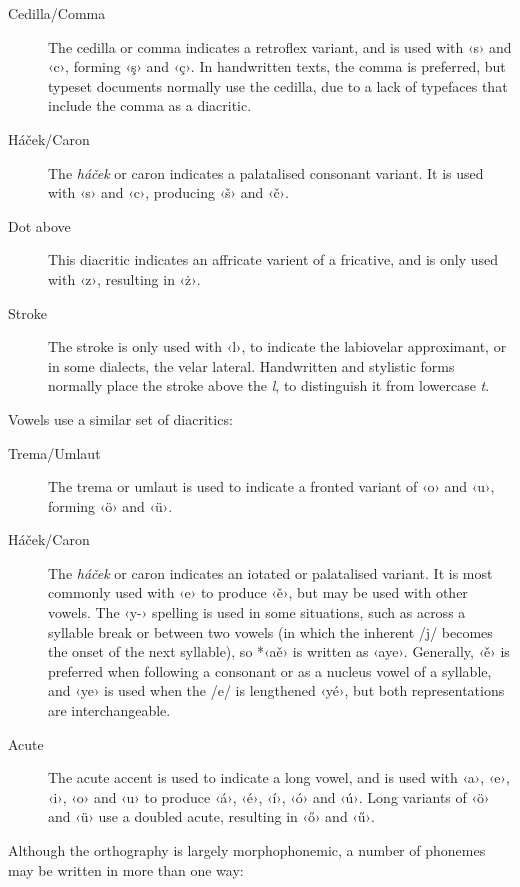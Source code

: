 \documentclass[grammar]{subfiles}
\begin{document}
	\begin{description}
		\item[Cedilla/Comma] The cedilla or comma indicates a retroflex variant, and is used with ‹s› and ‹c›, forming ‹ş› and ‹ç›. In handwritten texts, the comma is preferred, but typeset documents normally use the cedilla, due to a lack of typefaces that include the comma as a diacritic.
		\item[Háček/Caron] The \emph{háček} or caron indicates a palatalised consonant variant. It is used with ‹s› and ‹c›, producing ‹š› and ‹č›.
		\item[Dot above] This diacritic indicates an affricate varient of a fricative, and is only used with ‹z›, resulting in ‹ż›.
		\item[Stroke] The stroke is only used with ‹l›, to indicate the labiovelar approximant, or in some dialects, the velar lateral. Handwritten and stylistic forms normally place the stroke above the \emph l, to distinguish it from lowercase \emph t.
	\end{description}

	Vowels use a similar set of diacritics:

	\begin{description}
		\item[Trema/Umlaut] The trema or umlaut is used to indicate a fronted variant of ‹o› and ‹u›, forming ‹ö› and ‹ü›.
		\item[Háček/Caron]\label{def:hacek} The \emph{háček} or caron indicates an iotated or palatalised variant. It is most commonly used with ‹e› to produce ‹ě›, but may be used with other vowels. The ‹y-› spelling is used in some situations, such as across a syllable break or between two vowels (in which the inherent /j/ becomes the onset of the next syllable), so *‹aě› is written as ‹aye›. Generally, ‹ě› is preferred when following a consonant or as a nucleus vowel of a syllable, and ‹ye› is used when the /e/ is lengthened ‹yé›, but both representations are interchangeable.
		\item[Acute] The acute accent is used to indicate a long vowel, and is used with ‹a›, ‹e›, ‹i›, ‹o› and ‹u› to produce ‹á›, ‹é›, ‹í›, ‹ó› and ‹ú›. Long variants of ‹ö› and ‹ü› use a doubled acute, resulting in ‹ő› and ‹ű›. 
	\end{description}

	Although the orthography is largely morphophonemic, a number of phonemes may be written in more than one way:
\end{document}
